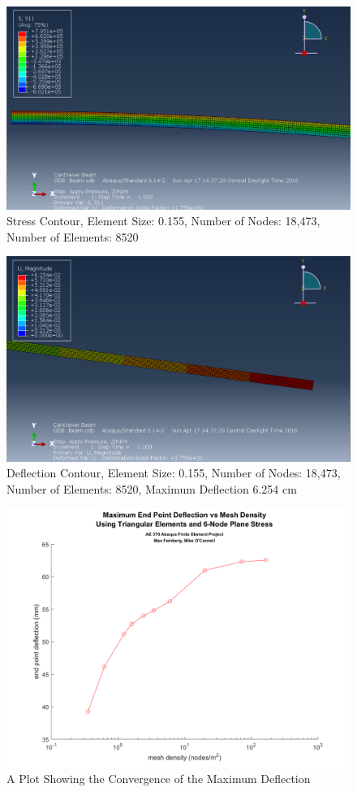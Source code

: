 \documentclass[a4paper]{article}
\begin{document}
\begin{figure}[ht]
\centering
\includegraphics[scale=.5]{6Nsize0_155Stress.PNG}
\caption{Stress Contour, Element Size: 0.155, Number of Nodes: 18,473, Number of Elements: 8520}
\end{figure}
\begin{figure}[ht]
\centering
\includegraphics[scale=.5]{6Nsize0_155MDisplacement.PNG}
\caption{Deflection Contour, Element Size: 0.155, Number of Nodes: 18,473, Number of Elements: 8520, Maximum Deflection 6.254 cm}
\end{figure}

\clearpage

\begin{figure}[ht]
\centering
\includegraphics[scale=.65]{ae370abaqus_6node.png}
\caption{A Plot Showing the Convergence of the Maximum Deflection}
\end{figure}
\end{document}
